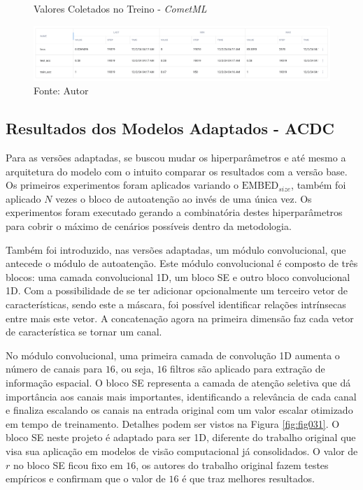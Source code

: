 \begin{figure}[h!]
    \centering
    \caption{Valores Coletados no Treino - \textit{CometML}}
    \includegraphics[width=1\textwidth]{figures/fig029.png}
    \caption*{Fonte: Autor}
    \label{fig:fig029}
\end{figure}


\subsection{Resultados dos Modelos Adaptados - ACDC}
\label{subsec:resultados_acdc_adaptado}

Para as versões adaptadas, se buscou mudar os hiperparâmetros e até mesmo a arquitetura do modelo com o intuito comparar os resultados com a versão base. Os primeiros experimentos foram aplicados variando o $\text{EMBED}_{size}$, também foi aplicado $N$ vezes o bloco de autoatenção ao invés de uma única vez. Os experimentos foram executado gerando a combinatória destes hiperparâmetros para cobrir o máximo de cenários possíveis dentro da metodologia.

Também foi introduzido, nas versões adaptadas, um módulo convolucional, que antecede o módulo de autoatenção. Este módulo convolucional é composto de três blocos: uma camada convolucional 1D, um bloco \gls{SE} e outro bloco convolucional 1D. Com a possibilidade de se ter adicionar opcionalmente um terceiro vetor de características, sendo este a máscara, foi possível identificar relações intrínsecas entre mais este vetor. A concatenação agora na primeira dimensão faz cada vetor de característica se tornar um canal. 

No módulo convolucional, uma primeira camada de convolução 1D aumenta o número de canais para $16$, ou seja, $16$ filtros são aplicado para extração de informação espacial. O bloco \gls{SE} representa a camada de atenção seletiva que dá importância aos canais mais importantes, identificando a relevância de cada canal e finaliza escalando os canais na entrada original com um valor escalar otimizado em tempo de treinamento. Detalhes podem ser vistos na Figura \ref{fig:fig031}. O bloco \gls{SE} neste projeto é adaptado para ser 1D, diferente do trabalho original que visa sua aplicação em modelos de visão computacional já consolidados. O valor de $r$ no bloco \gls{SE} ficou fixo em $16$, os autores do trabalho original fazem testes empíricos e confirmam que o valor de $16$ é que traz melhores resultados.

